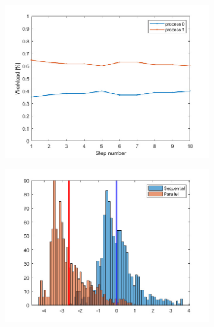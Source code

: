 \documentclass{beamer}
\begin{document}
\begin{frame}
\begin{figure}
\begin{subfigure}{.333\textwidth}
		\end{subfigure}%
		\begin{subfigure}{.333\textwidth}
			\includegraphics[width=\linewidth]{etc/test6_1.jpeg}
		\end{subfigure}
		\begin{subfigure}{.333\textwidth}
			\includegraphics[width=\linewidth]{etc/test4_3.jpeg}
		\end{subfigure}%
		\begin{subfigure}{.333\textwidth}

\end{subfigure}
\end{figure}
\end{frame}
\end{document}
